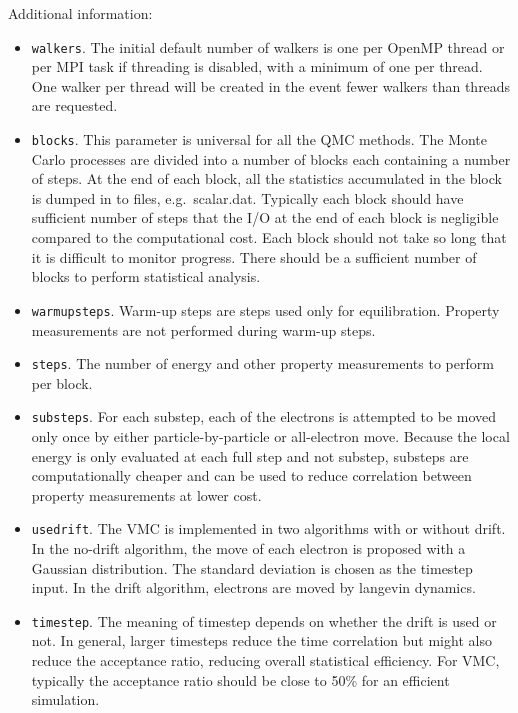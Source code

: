 Additional information:
\begin{itemize}
\item \texttt{walkers}. The initial default number of walkers is one per OpenMP thread or per MPI task if threading is disabled, with a minimum of one per thread. One walker per thread will be created in the event fewer walkers than threads are requested. 

\item \texttt{blocks}. This parameter is universal for all the QMC
  methods. The Monte Carlo processes are divided into a number of
  blocks each containing a number of steps. At the end of each block,
  all the statistics accumulated in the block is dumped in to files,
  e.g.\ scalar.dat. Typically each block should have sufficient number
  of steps that the I/O at the end of each block is negligible
  compared to the computational cost. Each block should not take so
  long that it is difficult to monitor progress. There should be a
  sufficient number of blocks to perform statistical analysis.

\item \texttt{warmupsteps}. Warm-up steps are steps used only for
  equilibration. Property measurements are not performed during
  warm-up steps.

\item \texttt{steps}. The number of energy and other property measurements to perform per block.
  
\item \texttt{substeps}. For each substep, each of the electrons is
  attempted to be moved only once by either particle-by-particle or
  all-electron move.  Because the local energy is only evaluated at
  each full step and not substep, substeps are computationally cheaper
  and can be used to reduce correlation between property measurements
  at lower cost.
  
\item \texttt{usedrift}. The VMC is implemented in two algorithms with
  or without drift. In the no-drift algorithm, the move of each
  electron is proposed with a Gaussian distribution. The standard
  deviation is chosen as the timestep input. In the drift algorithm,
  electrons are moved by langevin dynamics.

\item \texttt{timestep}. The meaning of timestep depends on whether
  the drift is used or not. In general, larger timesteps reduce the
  time correlation but might also reduce the acceptance ratio,
  reducing overall statistical efficiency. For VMC, typically the
  acceptance ratio should be close to 50\% for an efficient
  simulation.


\end{itemize}
